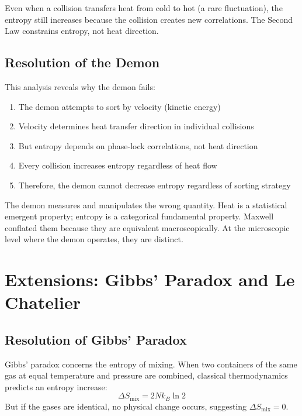 Even when a collision transfers heat from cold to hot (a rare fluctuation), the entropy still increases because the collision creates new correlations. The Second Law constrains entropy, not heat direction.

\subsection{Resolution of the Demon}

This analysis reveals why the demon fails:

\begin{enumerate}
\item The demon attempts to sort by velocity (kinetic energy)
\item Velocity determines heat transfer direction in individual collisions
\item But entropy depends on phase-lock correlations, not heat direction
\item Every collision increases entropy regardless of heat flow
\item Therefore, the demon cannot decrease entropy regardless of sorting strategy
\end{enumerate}

The demon measures and manipulates the wrong quantity. Heat is a statistical emergent property; entropy is a categorical fundamental property. Maxwell conflated them because they are equivalent macroscopically. At the microscopic level where the demon operates, they are distinct.

\section{Extensions: Gibbs' Paradox and Le Chatelier}
\label{sec:extensions}

\subsection{Resolution of Gibbs' Paradox}

Gibbs' paradox concerns the entropy of mixing. When two containers of the same gas at equal temperature and pressure are combined, classical thermodynamics predicts an entropy increase:
\begin{equation}
\Delta S_{\text{mix}} = 2Nk_B \ln 2
\end{equation}
But if the gases are identical, no physical change occurs, suggesting $\Delta S_{\text{mix}} = 0$.

